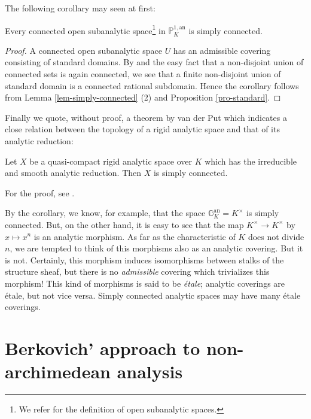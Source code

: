 \vspace{1ex}
The following corollary may seen at first:

\begin{appcor}\label{cor-simply-connected}
Every connected open subanalytic space\footnote{We refer \cite[9.3.1]{na} 
for the definition of open subanalytic spaces.} in 
$\mathbb{P}^{1,\mathrm{an}}_K$ is simply connected.
\end{appcor}

\begin{proof}
A connected open subanalytic space $U$ has an admissible covering 
consisting of standard domains.
By \cite[III,2.6]{sgamc} and the easy fact that a non-disjoint union of 
connected sets is again connected, we see that a finite non-disjoint
union of standard domain is a connected rational subdomain.
Hence the corollary follows from Lemma \ref{lem-simply-connected} (2)
and Proposition \ref{pro-standard}.
\end{proof}

\vspace{1ex}
Finally we quote, without proof, a theorem by van der Put 
which indicates a close relation between the topology 
of a rigid analytic space and that of its analytic reduction:

\begin{appthm}\label{thm-vanderput}
Let $X$ be a quasi-compact rigid analytic space over $K$ which has 
the irreducible and smooth analytic reduction. Then $X$ is simply
connected.
\end{appthm}

For the proof, see \cite{anopu}.
\begin{apprem}
By the corollary, we know, for example, that the space
$\mathbb{G}^{\mathrm{an}}_K=K^{\times}$ is simply connected.  But, on
the other hand, it is easy to see that the map $K^{\times} \rightarrow
K^{\times}$ by $x\mapsto x^n$ is an analytic morphism.  As far as the
characteristic of $K$ does not divide $n$, we are tempted to think of
this morphisms also as an analytic covering.  But it is not.  Certainly,
this morphism induces isomorphisms between stalks of the structure
sheaf, but there is no {\it admissible} covering which trivializes this
morphism! 
This kind of morphisms is said to be {\it \'etale}; analytic coverings
are \'etale, but not vice versa.  Simply connected analytic spaces
may have many \'etale coverings.
\end{apprem}

\section{Berkovich' approach to non-archimedean analysis}

